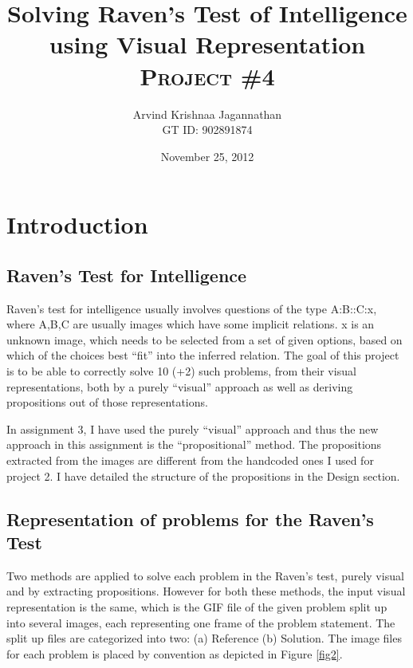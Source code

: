 \documentclass[10pt, letter]{article}
\newcommand{\doctitle}{%
Solving Raven's Test of Intelligence using Visual Representation}
\begin{document}
\title{\textbf{\doctitle}\\
\textsc{Project \#4}
}
  \author {Arvind Krishnaa Jagannathan \\ GT ID: 902891874}
   \date{November 25, 2012}
\maketitle

\section{Introduction}
\subsection*{Raven's Test for Intelligence}
Raven's test for intelligence usually involves questions of the type A:B::C:x, where A,B,C are usually images which have some implicit relations. x is an unknown image, which needs to be selected from a set of given options, based on which of the choices best ``fit'' into the inferred relation. The goal of this project is to be able to correctly solve 10 (+2) such problems, from their visual representations, both by a purely ``visual'' approach as well as deriving propositions out of those representations. 

In assignment 3, I have used the purely ``visual'' approach and thus the new approach in this assignment is the ``propositional'' method. The propositions extracted from the images are different from the handcoded ones I used for project 2. I have detailed the structure of the propositions in the Design section.

\subsection*{Representation of problems for the Raven's Test}

Two methods are applied to solve each problem in the Raven's test, purely visual and by extracting propositions. However for both these methods, the input visual representation is the same, which is the GIF file of the given problem split up into several images, each representing one frame of the problem statement. The split up files are categorized into two: (a) Reference (b) Solution. The image files for each problem is placed by convention as depicted in Figure \ref{fig2}.
\end{document}
